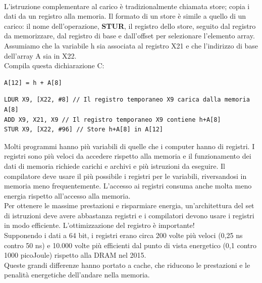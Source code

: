 \documentclass[12pt,a4paper]{article}
\begin{document}
\\
L'istruzione complementare al carico è tradizionalmente chiamata store; copia i dati da un registro alla memoria. Il formato di un store è simile a quello di un carico: il nome dell'operazione, \textbf{STUR}, il registro dello store, seguito dal registro da memorizzare, dal registro di base e dall'offset per selezionare l'elemento array.\\
Assumiamo che la variabile h sia associata al registro X21 e che l'indirizzo di base dell'array A sia in X22.\\
Compila questa dichiarazione C:
\begin{center}
\begin{minipage}{.2\linewidth}
\begin{verbatim}
A[12] = h + A[8]
\end{verbatim}
\end{minipage}
\end{center}
\begin{verbatim}
LDUR X9, [X22, #8] // Il registro temporaneo X9 carica dalla memoria A[8]
ADD X9, X21, X9 // Il registro temporaneo X9 contiene h+A[8]
STUR X9, [X22, #96] // Store h+A[8] in A[12]
\end{verbatim}
Molti programmi hanno più variabili di quelle che i computer hanno di registri. I registri sono più veloci da accedere rispetto alla memoria e il funzionamento dei dati di memoria richiede carichi e archivi e più istruzioni da eseguire. Il compilatore deve usare il più possibile i registri per le variabili, riversandosi in memoria meno frequentemente. L'accesso ai registri consuma anche molta meno energia rispetto all'accesso alla memoria.\\
Per ottenere le massime prestazioni e risparmiare energia, un'architettura del set di istruzioni deve avere abbastanza registri e i compilatori devono usare i registri in modo efficiente. L'ottimizzazione del registro è importante!	\\
Supponendo i dati a 64 bit, i registri erano circa 200 volte più veloci (0,25 ns contro 50 ns) e 10.000 volte più efficienti dal punto di vista energetico (0,1 contro 1000 picoJoule) rispetto alla DRAM nel 2015.\\
Queste grandi differenze hanno portato a cache, che riducono le prestazioni e le penalità energetiche dell'andare nella memoria.
\end{document}

